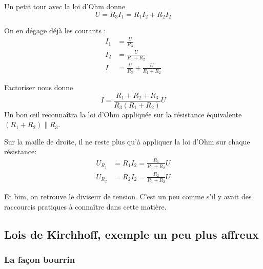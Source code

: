 \documentclass{article}
\begin{document}
Un petit tour avec la loi d'Ohm donne \[U=R_3I_1=R_1I_2+R_2I_2\]

\noindent On en dégage déjà les courants :
\begin{align*}
    I_1&=\frac{U}{R_3}\\
    I_2&=\frac{U}{R_1+R_2}\\
    I&=\frac{U}{R_3}+\frac{U}{R_1+R_2}
\end{align*}

Factoriser nous donne \[I=\frac{R_1+R_2+R_3}{R_3(R_1+R_2)}U\]
Un bon \oe{}il reconnaîtra la loi d'Ohm appliquée sur la résistance équivalente $(R_1+R_2)\parallel R_3$.

Sur la maille de droite, il ne reste plus qu'à appliquer la loi d'Ohm sur chaque résistance:
\begin{align*}
    U_{R_1}&=R_1I_2=\frac{R_1}{R_1+R_2}U\\
    U_{R_2}&=R_2I_2=\frac{R_2}{R_1+R_2}U
\end{align*}

Et bim, on retrouve le diviseur de tension. C'est un peu comme s'il y avait des raccourcis pratiques à connaître dans cette matière.

\subsection{Lois de Kirchhoff, exemple un peu plus affreux}

\subsubsection{La façon bourrin}
\label{sexo:bourrin}
\end{document}
